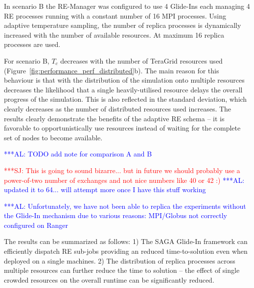 \documentclass{rspublic}
\newcommand{\alnote}[1]{ {\textcolor{blue} { ***AL: #1 }}}
\newcommand{\jhanote}[1]{ {\textcolor{red} { ***SJ: #1 }}}
\newcommand{\alnote}[1]{}
\newcommand{\jhanote}[1]{}
\begin{document}
{In scenario B the RE-Manager was configured to use 4 Glide-Ins each managing
4 RE processes running with a constant number of 16 MPI processes. Using adaptive
temperature sampling, the number of replica processes is dynamically increased with
the number of available resources. At maximum 16 replica processes are used.

For scenario B, $T_{c}$ decreases with the number of TeraGrid resources 
used (Figure~\ref{fig:performance_perf_distributed}b). 
The main reason for this behaviour is that with the distribution
of the simulation onto multiple resources decreases the likelihood
that a single heavily-utilised resource delays the overall progress of
the simulation. This is also reflected in the standard deviation,
which clearly decreases as the number of distributed resources used
increases. The results clearly demonstrate the benefits of the
adaptive RE schema -- it is favorable to opportunistically use
resources instead of waiting for the complete set of nodes to become
available.

\alnote{TODO add note for comparison A and B}

\jhanote{This is going to sound bizarre... but in future we should
  probably use a power-of-two number of exchanges and not nice numbers
  like 40 or 42 :)}           
\alnote{updated it to 64... will attempt more once I have this stuff working}

                                              
\alnote{Unfortunately, we have not been able to replica the
  experiments without the Glide-In mechanism due to various reasons:
  MPI/Globus not correctly configured on Ranger}

The results can be summarized as follows: 1) The SAGA Glide-In
framework can efficiently dispatch RE sub-jobs providing an reduced
time-to-solution even when deployed on a single machines.  2) The
distribution of replica processes across multiple resources can
further reduce the time to solution -- the effect of single crowded
resources on the overall runtime can be significantly reduced.

}
\end{document}
